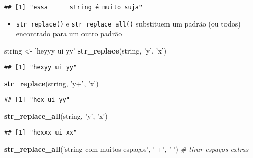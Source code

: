 \documentclass[]{book}
\newenvironment{Shaded}{\begin{snugshade}}{\end{snugshade}}
\newcommand{\KeywordTok}[1]{\textcolor[rgb]{0.13,0.29,0.53}{\textbf{{#1}}}}
\newcommand{\StringTok}[1]{\textcolor[rgb]{0.31,0.60,0.02}{{#1}}}
\newcommand{\CommentTok}[1]{\textcolor[rgb]{0.56,0.35,0.01}{\textit{{#1}}}}
\newcommand{\NormalTok}[1]{{#1}}
\providecommand{\tightlist}{%
  \setlength{\itemsep}{0pt}\setlength{\parskip}{0pt}}
\begin{document}
\begin{verbatim}
## [1] "essa      string é muito suja"
\end{verbatim}

\begin{itemize}
\tightlist
\item
  \texttt{str\_replace()} e \texttt{str\_replace\_all()} substituem um
  padrão (ou todos) encontrado para um outro padrão
\end{itemize}

\begin{Shaded}
\begin{Highlighting}[]
\NormalTok{string <-}\StringTok{ 'heyyy ui yy'}
\KeywordTok{str_replace}\NormalTok{(string, }\StringTok{'y'}\NormalTok{, }\StringTok{'x'}\NormalTok{)}
\end{Highlighting}
\end{Shaded}

\begin{verbatim}
## [1] "hexyy ui yy"
\end{verbatim}

\begin{Shaded}
\begin{Highlighting}[]
\KeywordTok{str_replace}\NormalTok{(string, }\StringTok{'y+'}\NormalTok{, }\StringTok{'x'}\NormalTok{)}
\end{Highlighting}
\end{Shaded}

\begin{verbatim}
## [1] "hex ui yy"
\end{verbatim}

\begin{Shaded}
\begin{Highlighting}[]
\KeywordTok{str_replace_all}\NormalTok{(string, }\StringTok{'y'}\NormalTok{, }\StringTok{'x'}\NormalTok{)}
\end{Highlighting}
\end{Shaded}

\begin{verbatim}
## [1] "hexxx ui xx"
\end{verbatim}

\begin{Shaded}
\begin{Highlighting}[]
\KeywordTok{str_replace_all}\NormalTok{(}\StringTok{'string     com    muitos espaços'}\NormalTok{, }\StringTok{' +'}\NormalTok{, }\StringTok{' '}\NormalTok{) }\CommentTok{# tirar espaços extras}
\end{Highlighting}
\end{Shaded}
\end{document}
